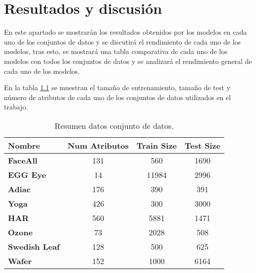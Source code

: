 \chapter{Resultados y discusión}
En este apartado se mostrarán los resultados obtenidos por los modelos en cada uno de los conjuntos de datos y se discutirá el rendimiento de cada uno de los modelos, tras esto, se mostrará una tabla comparativa de cada uno de los modelos con todos los conjuntos de datos y se analizará el rendimiento general de cada uno de los modelos.\newline

En la tabla \ref{tab:resumen_datasets} se muestran el tamaño de entrenamiento, tamaño de test y número de atributos de cada uno de los conjuntos de datos utilizados en el trabajo.\newline

\begin{table}[h]
	\centering
	\caption{Resumen datos conjunto de datos.}
	\label{tab:resumen_datasets}
\begin{tabular}{|l|c|c|c|}
	\hline
	\textbf{Nombre} &  \textbf{Num Atributos} & \textbf{Train Size} &   \textbf{Test Size} \\
	\hline
	\textbf{FaceAll} &          131 &      560 &     1690   \\
	\textbf{EGG Eye} &           14 &      11984 &   2996   \\
	\textbf{Adiac} &          176 &      390 &       391   \\
	\textbf{Yoga} &          426 &      300 &        3000  \\
	\textbf{HAR} &          560 &      5881 &       1471  \\
	\textbf{Ozone} &           73 &       2028 &      508  \\
	\textbf{Swedish Leaf} &          128 &      500 & 625  \\
	\textbf{Wafer} &          152 &     1000 &       6164 \\
	\hline
\end{tabular}
\end{table}


